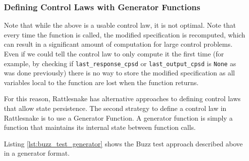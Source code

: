 \documentclass[pdf,12pt,report]{SANDreport}
\newcommand{\inlineCode}{\lstinline[basicstyle=\bfseries\ttfamily]}
\begin{document}
    \subsubsection{Defining Control Laws with Generator Functions}
    
    Note that while the above is a usable control law, it is not optimal.  Note that every time the function is called, the modified specification is recomputed, which can result in a significant amount of computation for large control problems.  Even if we could tell the control law to only compute it the first time (for example, by checking if \inlineCode{last_response_cpsd} or \inlineCode{last_output_cpsd} is \inlineCode{None} as was done previously) there is no way to store the modified specification as all variables local to the function are lost when the function returns.
    
    For this reason, Rattlesnake has alternative approaches to defining control laws that allow state persistence.  The second strategy to define a control law in Rattlesnake is to use a Generator Function.  A generator function is simply a function that maintains its internal state between function calls.
    
    Listing \ref{lst:buzz_test_generator} shows the Buzz test approach described above in a generator format.
    
\end{document}
